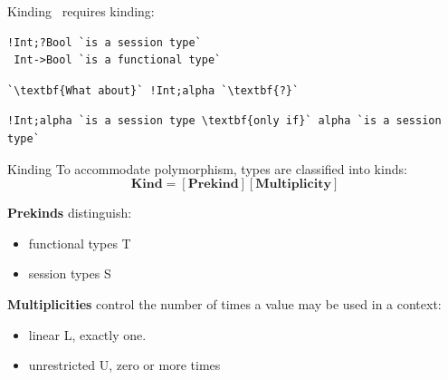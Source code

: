 \documentclass[10pt]{beamer}
\begin{document}
\begin{frame}[fragile]{Kinding}
	\freest\ requires kinding:
\begin{lstlisting}[escapeinside=\`\`]
!Int;?Bool `is a session type`
 Int->Bool `is a functional type`
\end{lstlisting}

\pause
\begin{tcolorbox}
\begin{lstlisting}[escapeinside=\`\`]
`\textbf{What about}` !Int;alpha `\textbf{?}`
\end{lstlisting}

\begin{lstlisting}[escapeinside=\`\`]
!Int;alpha `is a session type \textbf{only if}` alpha `is a session type`
\end{lstlisting}

\end{tcolorbox}		
\end{frame}

\begin{frame}{Kinding}
To accommodate polymorphism, types are classified into kinds:
$$ \textbf{Kind} = [\textbf{Prekind}][\textbf{Multiplicity}] $$

\textbf{Prekinds} distinguish:
\begin{itemize}
	\item functional types T
	\item session types S
\end{itemize}

\textbf{Multiplicities} control the number of times a value may be used in a context:
\begin{itemize}
	\item linear L, exactly one.
	\item unrestricted U, zero or more times
\end{itemize}

\pause
\vspace*{-1cm}

  \hspace*{7cm}

\vspace*{5mm}

\end{frame}
\end{document}
